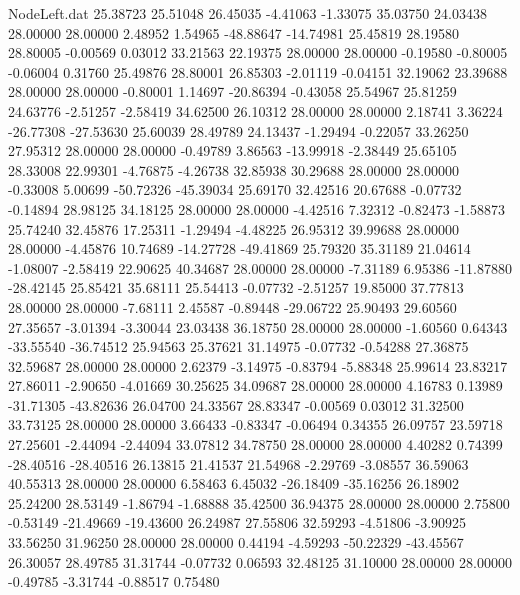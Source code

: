 \begin{filecontents}{NodeLeft.dat}
  25.38723   25.51048   26.45035    -4.41063   -1.33075   35.03750   24.03438   28.00000   28.00000    2.48952    1.54965  -48.88647  -14.74981
  25.45819   28.19580   28.80005    -0.00569    0.03012   33.21563   22.19375   28.00000   28.00000   -0.19580   -0.80005   -0.06004    0.31760
  25.49876   28.80001   26.85303    -2.01119   -0.04151   32.19062   23.39688   28.00000   28.00000   -0.80001    1.14697  -20.86394   -0.43058
  25.54967   25.81259   24.63776    -2.51257   -2.58419   34.62500   26.10312   28.00000   28.00000    2.18741    3.36224  -26.77308  -27.53630
  25.60039   28.49789   24.13437    -1.29494   -0.22057   33.26250   27.95312   28.00000   28.00000   -0.49789    3.86563  -13.99918   -2.38449
  25.65105   28.33008   22.99301    -4.76875   -4.26738   32.85938   30.29688   28.00000   28.00000   -0.33008    5.00699  -50.72326  -45.39034
  25.69170   32.42516   20.67688    -0.07732   -0.14894   28.98125   34.18125   28.00000   28.00000   -4.42516    7.32312   -0.82473   -1.58873
  25.74240   32.45876   17.25311    -1.29494   -4.48225   26.95312   39.99688   28.00000   28.00000   -4.45876   10.74689  -14.27728  -49.41869
  25.79320   35.31189   21.04614    -1.08007   -2.58419   22.90625   40.34687   28.00000   28.00000   -7.31189    6.95386  -11.87880  -28.42145
  25.85421   35.68111   25.54413    -0.07732   -2.51257   19.85000   37.77813   28.00000   28.00000   -7.68111    2.45587   -0.89448  -29.06722
  25.90493   29.60560   27.35657    -3.01394   -3.30044   23.03438   36.18750   28.00000   28.00000   -1.60560    0.64343  -33.55540  -36.74512
  25.94563   25.37621   31.14975    -0.07732   -0.54288   27.36875   32.59687   28.00000   28.00000    2.62379   -3.14975   -0.83794   -5.88348
  25.99614   23.83217   27.86011    -2.90650   -4.01669   30.25625   34.09687   28.00000   28.00000    4.16783    0.13989  -31.71305  -43.82636
  26.04700   24.33567   28.83347    -0.00569    0.03012   31.32500   33.73125   28.00000   28.00000    3.66433   -0.83347   -0.06494    0.34355
  26.09757   23.59718   27.25601    -2.44094   -2.44094   33.07812   34.78750   28.00000   28.00000    4.40282    0.74399  -28.40516  -28.40516
  26.13815   21.41537   21.54968    -2.29769   -3.08557   36.59063   40.55313   28.00000   28.00000    6.58463    6.45032  -26.18409  -35.16256
  26.18902   25.24200   28.53149    -1.86794   -1.68888   35.42500   36.94375   28.00000   28.00000    2.75800   -0.53149  -21.49669  -19.43600
  26.24987   27.55806   32.59293    -4.51806   -3.90925   33.56250   31.96250   28.00000   28.00000    0.44194   -4.59293  -50.22329  -43.45567
  26.30057   28.49785   31.31744    -0.07732    0.06593   32.48125   31.10000   28.00000   28.00000   -0.49785   -3.31744   -0.88517    0.75480

\end{filecontents}
